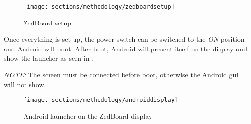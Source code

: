 \begin{figure}[htbp]
\centering
\texttt{[image: sections/methodology/zedboardsetup]}
\caption{\label{fig:zedboardsetup} ZedBoard setup}
\end{figure}

Once everything is set up, the power switch can be switched to the \emph{ON}
position and Android will boot.
After boot, Android will present itself on the display and show the launcher
as seen in .

\emph{NOTE:} The screen must be connected before boot, otherwise the Android
\gls{gui} will not show.

\begin{figure}[htbp]
\centering
\texttt{[image: sections/methodology/androiddisplay]}
\caption{\label{fig:androiddisplay} Android launcher on the ZedBoard display}
\end{figure}
